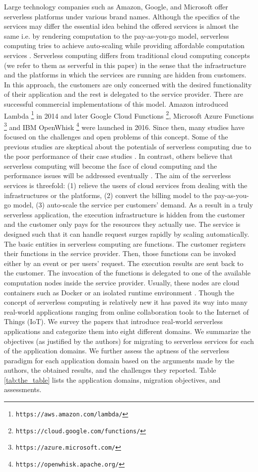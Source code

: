 

Large technology companies such as Amazon, Google, and Microsoft offer serverless platforms under various brand names. Although the specifics of the services may differ the essential idea behind the offered services is almost the same i.e. by rendering computation to the pay-as-you-go model, serverless computing tries to achieve auto-scaling while providing affordable computation services . 
Serverless computing differs from traditional cloud computing concepts (we refer to them as serverful in this paper) in the sense that the infrastructure and the platforms in which the services are running are hidden from customers. In this approach, the customers are only concerned with the desired functionality of their application and the rest is delegated to the service provider.
There are successful commercial implementations of this model. Amazon introduced Lambda \footnote{ \texttt{https://aws.amazon.com/lambda/}} in 2014 and later Google Cloud Functions \footnote{\texttt{https://cloud.google.com/functions/}}, Microsoft Azure Functions \footnote{\texttt{https://azure.microsoft.com/}} and IBM OpenWhisk \footnote{\texttt{https://openwhisk.apache.org/}} were launched in 2016. Since then, many studies have focused on the challenges and open problems of this concept. Some of the previous studies are skeptical about the potentials of serverless computing due to the poor performance of their case studies . In contrast, others believe that serverless computing will become the face of cloud computing and the performance issues will be addressed eventually .
The aim of the serverless services is threefold: (1) relieve the users of cloud services from dealing with the infrastructures or the platforms, (2) convert the billing model to the pay-as-you-go model, (3) auto-scale the service per customers' demand. As a result in a truly serverless application, the execution infrastructure is hidden from the customer and the customer only pays for the resources they actually use. The service is designed such that it can handle request surges rapidly by scaling automatically. The basic entities in serverless computing are functions. The customer registers their functions in the service provider. Then, those functions can be invoked either by an event or per users' request. The execution results are sent back to the customer. The invocation of the functions is delegated to one of the available computation nodes inside the service provider. Usually, these nodes are cloud containers such as Docker  or an isolated runtime environment .
Though the concept of serverless computing is relatively new it has paved its way into many real-world applications ranging from online collaboration tools to the Internet of Things (IoT). We survey the papers that introduce real-world serverless applications and categorize them into eight different domains. We summarize the objectives (as justified by the authors) for migrating to serverless services for each of the application domains. We further assess the aptness of the serverless paradigm for each application domain based on the arguments made by the authors, the obtained results, and the challenges they reported. Table \ref{tab:the_table} lists the application domains, migration objectives, and assessments.
